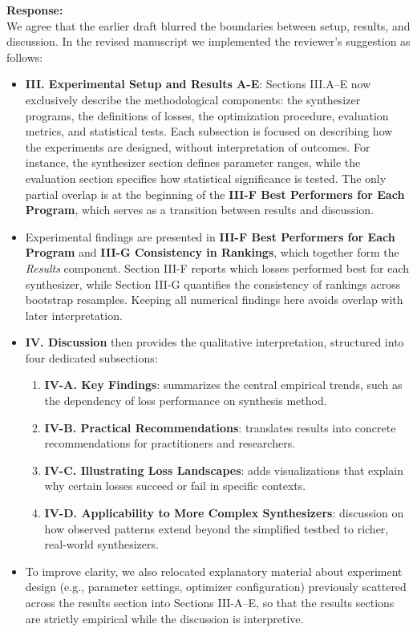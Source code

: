 \documentclass[11pt]{article}
\begin{document}
\noindent\textbf{Response:} \\
We agree that the earlier draft blurred the boundaries between setup, results, and discussion. In the revised manuscript we implemented the reviewer’s suggestion as follows:

\begin{itemize}
  \item \textbf{III. Experimental Setup and Results A-E}: Sections III.A–E now exclusively describe the methodological components: the synthesizer programs, the definitions of losses, the optimization procedure, evaluation metrics, and statistical tests. Each subsection is focused on describing how the experiments are designed, without interpretation of outcomes. For instance, the synthesizer section defines parameter ranges, while the evaluation section specifies how statistical significance is tested. The only partial overlap is at the beginning of the \textbf{III-F Best Performers for Each Program}, which serves as a transition between results and discussion.

  \item Experimental findings are presented in \textbf{III-F Best Performers for Each Program} and \textbf{III-G Consistency in Rankings}, which together form the \emph{Results} component. Section III-F reports which losses performed best for each synthesizer, while Section III-G quantifies the consistency of rankings across bootstrap resamples. Keeping all numerical findings here avoids overlap with later interpretation.  

  \item \textbf{IV. Discussion} then provides the qualitative interpretation, structured into four dedicated subsections:  
    \begin{enumerate}
      \item \textbf{IV-A. Key Findings}: summarizes the central empirical trends, such as the dependency of loss performance on synthesis method.  
      \item \textbf{IV-B. Practical Recommendations}: translates results into concrete recommendations for practitioners and researchers.  
      \item \textbf{IV-C. Illustrating Loss Landscapes}: adds visualizations that explain why certain losses succeed or fail in specific contexts.  
      \item \textbf{IV-D. Applicability to More Complex Synthesizers}: discussion on how observed patterns extend beyond the simplified testbed to richer, real-world synthesizers.  
    \end{enumerate}

  \item To improve clarity, we also relocated explanatory material about experiment design (e.g., parameter settings, optimizer configuration) previously scattered across the results section into Sections III-A–E, so that the results sections are strictly empirical while the discussion is interpretive.  
\end{itemize}
\end{document}
